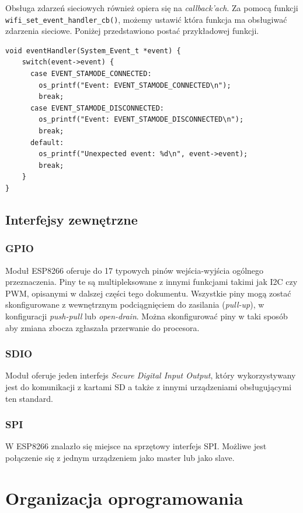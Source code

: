 Obsługa zdarzeń sieciowych również opiera się na \textit{callback'ach}. Za pomocą 
funkcji \verb+wifi_set_event_handler_cb()+, możemy ustawić która funkcja ma 
obsługiwać zdarzenia sieciowe. Poniżej przedstawiono postać przykładowej funkcji.\\

\begin{lstlisting}[style=customc,
    frame=single,
    caption={Przykładowa postać funkcji obsługującej zdarzenia sieciowe},
    captionpos=b,
    label={event_handler_cb}]
void eventHandler(System_Event_t *event) {
    switch(event->event) {
      case EVENT_STAMODE_CONNECTED:
        os_printf("Event: EVENT_STAMODE_CONNECTED\n");
        break;
      case EVENT_STAMODE_DISCONNECTED:
        os_printf("Event: EVENT_STAMODE_DISCONNECTED\n");
        break;
      default:
        os_printf("Unexpected event: %d\n", event->event);
        break;
    }
}
\end{lstlisting}

\subsection{Interfejsy zewnętrzne}
\label{interfejsy}

\subsubsection{GPIO}
\label{gpio}
Moduł ESP8266 oferuje do 17 typowych pinów wejścia-wyjścia ogólnego przeznaczenia. Piny
te są multipleksowane z innymi funkcjami takimi jak I2C czy PWM, opisanymi w dalszej 
części tego dokumentu. Wszystkie piny mogą zostać skonfigurowane z wewnętrznym 
podciągnięciem do zasilania (\textit{pull-up}), w konfiguracji \textit{push-pull} lub 
\textit{open-drain}. Można skonfigurować piny w taki sposób aby zmiana zbocza zgłaszała
przerwanie do procesora.


\subsubsection{SDIO}
\label{sdio}
Moduł oferuje jeden interfejs \textit{Secure Digital Input Output}, który wykorzystywany
jest do komunikacji z kartami SD a także z innymi urządzeniami obsługującymi ten standard.


\subsubsection{SPI}
\label{spi}
W ESP8266 znalazło się miejsce na sprzętowy interfejs SPI. Możliwe jest połączenie się z jednym
urządzeniem jako master lub jako slave.


\section{Organizacja oprogramowania}
\label{organizacja_opr}